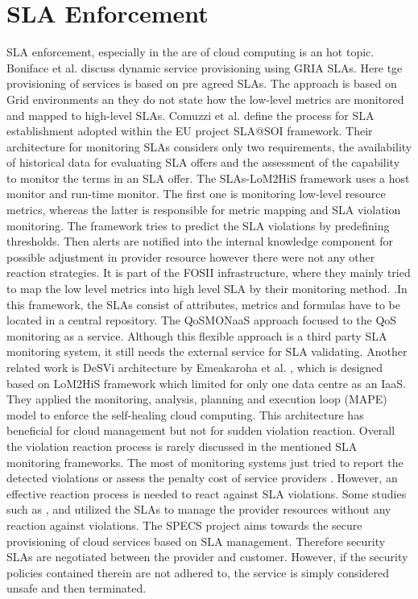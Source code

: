 \section{SLA Enforcement}
SLA enforcement, especially in the are of cloud computing is an hot topic. Boniface et al.  \cite{boniface2007dynamic} discuss dynamic service provisioning using GRIA SLAs. Here tge provisioning of services is based on pre agreed SLAs. The approach is based on Grid environments an they do not state how the low-level metrics are monitored and mapped to high-level SLAs. Comuzzi et al.  \cite{5175897} define the process for SLA establishment adopted within the EU project SLA@SOI framework. Their architecture for monitoring SLAs considers only two requirements, the availability of historical data for evaluating SLA offers and the assessment of the capability to monitor the terms in an SLA offer. The SLAs-LoM2HiS framework  \cite{emeakaroha2010low}uses a host monitor and run-time monitor. The first one is monitoring low-level resource metrics, whereas the latter is responsible for metric mapping and SLA violation monitoring. The framework tries to predict the SLA violations by predefining thresholds. Then alerts are notified into the internal knowledge component for possible adjustment in provider resource however there were not any other reaction strategies. It is part of the FOSII  \cite{fosii} infrastructure, where they mainly tried to map the low level metrics into high level SLA by their monitoring method.  \cite{articleEmeakaroha2013}.In this framework, the SLAs consist of attributes, metrics and formulas have to be located in a central repository. The QoSMONaaS approach  \cite{articleQoSMONaas} focused to the QoS monitoring as a service. Although this flexible approach is a third party SLA monitoring system, it still needs the external service for SLA validating. Another related work is DeSVi architecture by Emeakaroha et al.  \cite{EMEAKAROHA20121017}, which is designed based on LoM2HiS  \cite{5547150} framework which limited for only one data centre as an IaaS. They applied the monitoring, analysis, planning and execution loop (MAPE) model to enforce the self-healing cloud computing. This architecture has beneficial for cloud management but not for sudden violation reaction. Overall the violation reaction process is rarely discussed in the mentioned SLA monitoring frameworks. The most of monitoring systems just tried to report the detected violations  \cite{6225938}  \cite{5175897} or assess the penalty cost of service providers  \cite{10.1007/978-3-642-22709-7_46}  \cite{Dastjerdi:2012:DOA:2275356.2275360}. However, an effective reaction process is needed to react against SLA violations. Some studies such as  \cite{6212007},  \cite{6150077} and  \cite{WANG20121135} utilized the SLAs to manage the provider resources without any reaction against violations. The SPECS project \cite{7430360} aims towards the secure provisioning of cloud services based on SLA management. Therefore security SLAs are negotiated between the provider and customer. However, if the security policies contained therein are not adhered to, the service is simply considered unsafe and then terminated.

